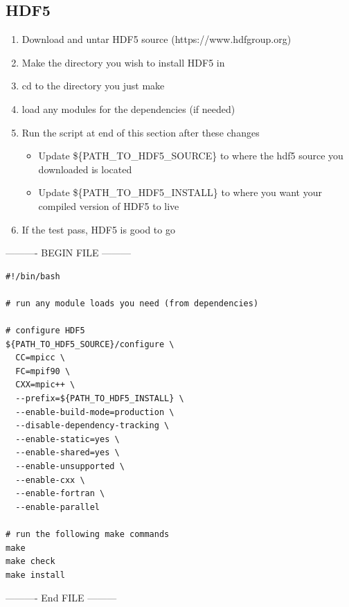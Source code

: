 \documentclass{article}
\begin{document}
\subsection{HDF5} %
\label{sub:hdf5}
\begin{enumerate}
  \item Download and untar HDF5 source (https://www.hdfgroup.org)
  \item Make the directory you wish to install HDF5 in
  \item cd to the directory you just make
  \item load any modules for the dependencies (if needed)
  \item Run the script at end of this section after these changes
  \begin{itemize}
    \item Update \$\{PATH\_TO\_HDF5\_SOURCE\} to where the hdf5 source you downloaded is located
    \item Update \$\{PATH\_TO\_HDF5\_INSTALL\} to where you want your compiled version of HDF5 to live
  \end{itemize}
  \item If the test pass, HDF5 is good to go
\end{enumerate}

---------- BEGIN FILE ---------
\begin{verbatim}
#!/bin/bash

# run any module loads you need (from dependencies)

# configure HDF5
${PATH_TO_HDF5_SOURCE}/configure \
  CC=mpicc \
  FC=mpif90 \
  CXX=mpic++ \
  --prefix=${PATH_TO_HDF5_INSTALL} \
  --enable-build-mode=production \
  --disable-dependency-tracking \
  --enable-static=yes \
  --enable-shared=yes \
  --enable-unsupported \
  --enable-cxx \
  --enable-fortran \
  --enable-parallel

# run the following make commands
make 
make check 
make install
\end{verbatim}
---------- End FILE ---------
\end{document}
